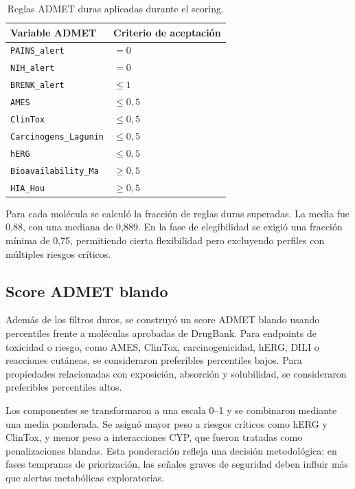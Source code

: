 \documentclass[IB]{TFUOC}%
\begin{document}
\begin{table}[H]
    \centering
    \small
    \begin{tabular}{p{5cm} p{5cm}}
        \hline
        \textbf{Variable ADMET} & \textbf{Criterio de aceptación} \\
        \hline
        \texttt{PAINS\_alert} & $= 0$ \\
        \texttt{NIH\_alert} & $= 0$ \\
        \texttt{BRENK\_alert} & $\leq 1$ \\
        \texttt{AMES} & $\leq 0,5$ \\
        \texttt{ClinTox} & $\leq 0,5$ \\
        \texttt{Carcinogens\_Lagunin} & $\leq 0,5$ \\
        \texttt{hERG} & $\leq 0,5$ \\
        \texttt{Bioavailability\_Ma} & $\geq 0,5$ \\
 
        \texttt{HIA\_Hou} & $\geq 0,5$ \\
        \hline
    \end{tabular}
    \caption{Reglas ADMET duras aplicadas durante el scoring.}
    \label{tab:filtros_admet_duros}
\end{table}

Para cada molécula se calculó la fracción de reglas duras superadas. La media fue 0,88, con una mediana de 0,889. En la fase de elegibilidad se exigió una fracción mínima de 0,75, permitiendo cierta flexibilidad pero excluyendo perfiles con múltiples riesgos críticos.

\subsection{Score ADMET blando}

Además de los filtros duros, se construyó un score ADMET blando usando percentiles frente a moléculas aprobadas de DrugBank. Para endpoints de toxicidad o riesgo, como AMES, ClinTox, carcinogenicidad, hERG, DILI o reacciones cutáneas, se consideraron preferibles percentiles bajos. Para propiedades relacionadas con exposición, absorción y solubilidad, se consideraron preferibles percentiles altos.

Los componentes se transformaron a una escala 0--1 y se combinaron mediante una media ponderada. Se asignó mayor peso a riesgos críticos como hERG y ClinTox, y menor peso a interacciones CYP, que fueron tratadas como penalizaciones blandas. Esta ponderación refleja una decisión metodológica: en fases tempranas de priorización, las señales graves de seguridad deben influir más que alertas metabólicas exploratorias.
\end{document}
